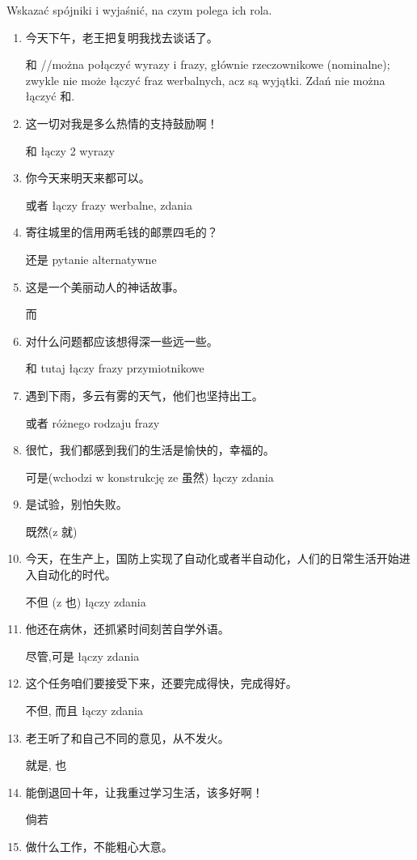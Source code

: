 Wskazać spójniki i wyjaśnić, na czym polega
ich rola.
\begin{enumerate} 
\item 今天下午，老王把复明我找去谈话了。%

和 //można połączyć wyrazy i frazy, głównie rzeczownikowe (nominalne);
zwykle nie może łączyć fraz werbalnych, acz są wyjątki. Zdań nie można łączyć 和.
\item 这一切对我是多么热情的支持鼓励啊！%

和 łączy 2 wyrazy
\item 你今天来明天来都可以。%

或者 łączy frazy werbalne, zdania
\item 寄往城里的信用两毛钱的邮票四毛的？ %

还是 pytanie alternatywne
\item 这是一个美丽动人的神话故事。%

而
\item 对什么问题都应该想得深一些远一些。%

和 tutaj łączy frazy przymiotnikowe
\item 遇到下雨，多云有雾的天气，他们也坚持出工。%

或者 różnego rodzaju frazy
\item {}很忙，我们都感到我们的生活是愉快的，幸福的。%

可是(wchodzi w konstrukcję ze 虽然) łączy zdania
\item {}是试验，别怕失败。%

既然(z 就)
\item 今天，在生产上，国防上实现了自动化或者半自动化，人们的日常生活开始进入自动化的时代。%

不但 (z 也) łączy zdania
\item 他还在病休，还抓紧时间刻苦自学外语。%

尽管,可是 łączy zdania
\item 这个任务咱们要接受下来，还要完成得快，完成得好。%

不但, 而且 łączy zdania
\item 老王听了和自己不同的意见，从不发火。%

就是, 也
\item {}能倒退回十年，让我重过学习生活，该多好啊！%

倘若
\item {}做什么工作，不能粗心大意。%


\end{enumerate}

